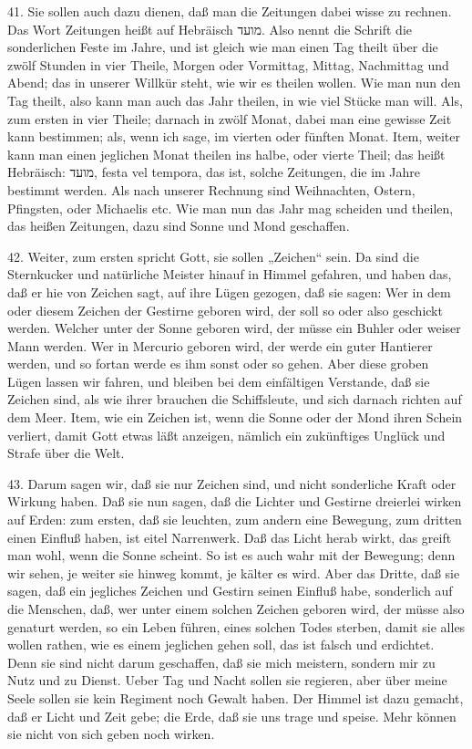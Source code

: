 41. Sie sollen auch dazu dienen, daß man die Zeitungen dabei wisse zu rechnen. Das Wort Zeitungen heißt auf Hebräisch מועד. Also nennt die Schrift die sonderlichen Feste im Jahre, und ist gleich wie man einen Tag theilt über die zwölf Stunden in vier Theile, Morgen oder Vormittag, Mittag, Nachmittag und Abend; das in unserer Willkür steht, wie wir es theilen wollen. Wie man nun den Tag theilt, also kann man auch das Jahr theilen, in wie viel Stücke man will. Als, zum ersten in vier Theile; darnach in zwölf Monat, dabei man eine gewisse Zeit kann bestimmen; als, wenn ich sage, im vierten oder fünften Monat. Item, weiter kann man einen jeglichen Monat theilen ins halbe, oder vierte Theil; das heißt Hebräisch: מועד, festa vel tempora, das ist, solche Zeitungen, die im Jahre bestimmt werden. Als nach unserer Rechnung sind Weihnachten, Ostern, Pfingsten, oder Michaelis etc. Wie man nun das Jahr mag scheiden und theilen, das heißen Zeitungen, dazu sind Sonne und Mond geschaffen.

42. Weiter, zum ersten spricht Gott, sie sollen „Zeichen“ sein. Da sind die Sternkucker und natürliche Meister hinauf in Himmel gefahren, und haben das, daß er hie von Zeichen sagt, auf ihre Lügen gezogen, daß sie sagen: Wer in dem oder diesem Zeichen der Gestirne geboren wird, der soll so oder also geschickt werden. Welcher unter der Sonne geboren wird, der müsse ein Buhler oder weiser Mann werden. Wer in Mercurio geboren wird, der werde ein guter Hantierer werden, und so fortan werde es ihm sonst oder so gehen. Aber diese groben Lügen lassen wir fahren, und bleiben bei dem einfältigen Verstande, daß sie Zeichen sind, als wie ihrer brauchen die Schiffsleute, und sich darnach richten auf dem Meer. Item, wie ein Zeichen ist, wenn die Sonne oder der Mond ihren Schein verliert, damit Gott etwas läßt anzeigen, nämlich ein zukünftiges Unglück und Strafe über die Welt.

43. Darum sagen wir, daß sie nur Zeichen sind, und nicht sonderliche Kraft oder Wirkung haben. Daß sie nun sagen, daß die Lichter und Gestirne dreierlei wirken auf Erden: zum ersten, daß sie leuchten, zum andern eine Bewegung, zum dritten einen Einfluß haben, ist eitel Narrenwerk. Daß das Licht herab wirkt, das greift man wohl, wenn die Sonne scheint. So ist es auch wahr mit der Bewegung; denn wir sehen, je weiter sie hinweg kommt, je kälter es wird. Aber das Dritte, daß sie sagen, daß ein jegliches Zeichen und Gestirn seinen Einfluß habe, sonderlich auf die Menschen, daß, wer unter einem
solchen Zeichen geboren wird, der müsse also genaturt werden, so ein Leben führen, eines solchen Todes sterben, damit sie alles wollen rathen, wie es einem jeglichen gehen soll, das ist falsch und erdichtet. Denn sie sind nicht darum geschaffen, daß sie mich meistern, sondern mir zu Nutz und zu Dienst. Ueber Tag und Nacht sollen sie regieren, aber über meine Seele sollen sie kein Regiment noch Gewalt haben. Der Himmel ist dazu gemacht, daß er Licht und Zeit gebe; die Erde, daß sie uns trage und speise. Mehr können sie nicht von sich geben noch wirken.

